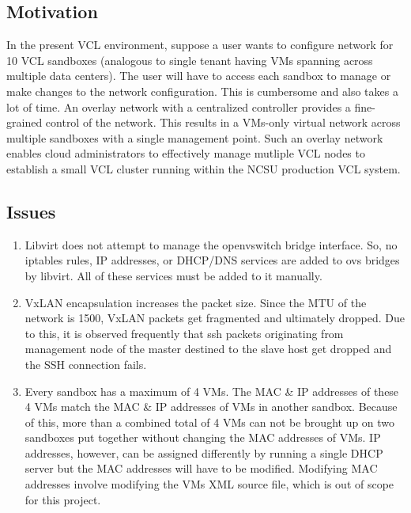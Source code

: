 \documentclass[12pt]{extarticle}
\begin{document}

\subsection{Motivation}

In the present VCL environment, suppose a user wants to configure network for 10 VCL sandboxes (analogous to single tenant having VMs spanning across multiple data centers). The user will have to access each sandbox to manage or make changes to the network configuration. This is cumbersome and also takes a lot of time. An overlay network with a centralized controller provides a fine-grained control of the network. This results in a VMs-only virtual network across multiple sandboxes with a single management point. Such an overlay network enables cloud administrators to effectively manage mutliple VCL nodes to establish a small VCL cluster running within the NCSU production VCL system. 

\subsection{Issues}
\begin{enumerate}
    \item Libvirt does not attempt to manage the openvswitch bridge interface. So, no iptables rules, IP addresses, or DHCP/DNS services are added to ovs bridges by libvirt. All of these services must be added to it manually. 
    \item VxLAN encapsulation increases the packet size. Since the MTU of the network is 1500, VxLAN packets get fragmented and ultimately dropped. Due to this, it is observed frequently that ssh packets originating from management node of the master destined to the slave host get dropped and the SSH connection fails.
    \item Every sandbox has a maximum of 4 VMs. The MAC \& IP addresses of these 4 VMs match the MAC \& IP addresses of VMs in another sandbox. Because of this, more than a combined total of 4 VMs can not be brought up on two sandboxes put together without changing the MAC addresses of VMs. IP addresses, however, can be assigned differently by running a single DHCP server but the MAC addresses will have to be modified. Modifying MAC addresses involve modifying the VMs XML source file, which is out of scope for this project.
\end{enumerate}
\end{document}
